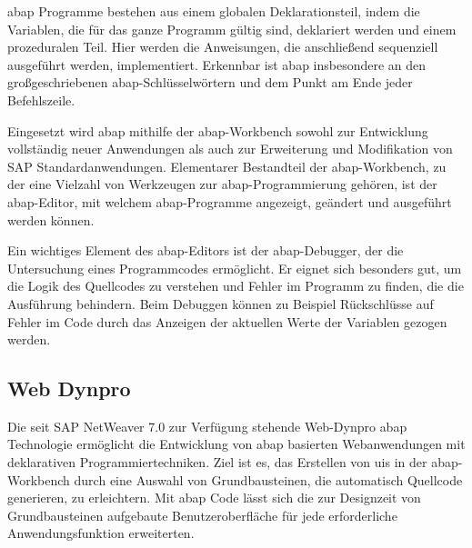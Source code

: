 \acs{abap} Programme bestehen aus einem globalen Deklarationsteil, indem die Variablen, die für das ganze Programm gültig sind, deklariert werden und einem prozeduralen Teil. Hier werden die Anweisungen, die anschließend sequenziell ausgeführt werden, implementiert.\autocite[Vgl.][S.92f]{KELLER2015} Erkennbar ist \acs{abap} insbesondere an den großgeschriebenen \acs{abap}-Schlüsselwörtern und dem Punkt am Ende jeder Befehlszeile. 

Eingesetzt wird \acs{abap} mithilfe der \acs{abap}-Workbench sowohl zur Entwicklung vollständig neuer Anwendungen als auch zur Erweiterung und Modifikation von SAP Standardanwendungen. Elementarer Bestandteil der \acs{abap}-Workbench, zu der eine Vielzahl von Werkzeugen zur \acs{abap}-Programmierung gehören, ist der \acs{abap}-Editor, mit welchem \acs{abap}-Programme angezeigt, geändert und ausgeführt werden können.\autocite[Vgl.][S.57,88f]{KELLER2015}

Ein wichtiges Element des \acs{abap}-Editors ist der \acs{abap}-Debugger, der die Untersuchung eines Programmcodes ermöglicht. Er eignet sich besonders gut, um die Logik des Quellcodes zu verstehen und Fehler im Programm zu finden, die die Ausführung behindern.\autocites[Vgl.][S.92-96]{S4D400}[S.87f]{GAHM2016} Beim Debuggen können zu Beispiel Rückschlüsse auf Fehler im Code durch das Anzeigen der aktuellen Werte der Variablen gezogen werden.



\subsection{Web Dynpro}

Die seit SAP NetWeaver 7.0 zur Verfügung stehende Web-Dynpro \acs{abap} Technologie ermöglicht die Entwicklung von \acs{abap} basierten Webanwendungen mit deklarativen Programmiertechniken. Ziel ist es, das Erstellen von \acp{ui} in der \acs{abap}-Workbench durch eine Auswahl von Grundbausteinen, die automatisch Quellcode generieren, zu erleichtern. Mit \acs{abap} Code lässt sich die zur Designzeit von Grundbausteinen aufgebaute Benutzeroberfläche für jede erforderliche Anwendungsfunktion erweiterten.\autocite[Vgl.][S.2f]{NET310}

